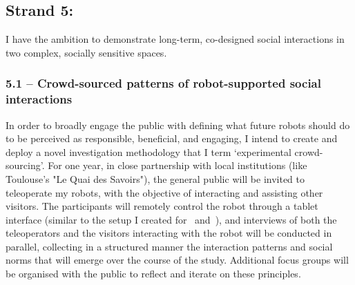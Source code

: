 % 
% 
% 
% 
% 
% 
% 
% 
% 



\subsection{Strand 5: \textbf{\wpFive}}

I have the ambition to demonstrate long-term, co-designed social
interactions in two complex, socially sensitive spaces.


\subsubsection{5.1 -- Crowd-sourced patterns of robot-supported social
interactions}

In order to broadly engage the public with defining what future robots should do
to be perceived as responsible, beneficial, and engaging, I intend to create and
deploy a novel investigation methodology that I term `experimental
crowd-sourcing'. For one year, in close partnership with local institutions
(like Toulouse's "Le Quai des Savoirs"), the general public will be invited to
teleoperate my robots, with the objective of interacting and assisting
other visitors. The participants will remotely control the robot through a
tablet interface (similar to the setup I created
for~\parencite{senft2019teaching} and~\parencite{winkle2020insitu}), and
interviews of both the teleoperators and the visitors interacting with the robot
will be conducted in parallel, collecting in a structured manner the interaction
patterns and social norms that will emerge over the course of the study.
Additional focus groups will be organised with the public to reflect and
iterate on these principles.

